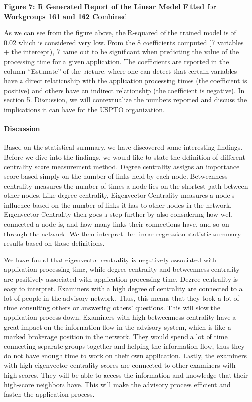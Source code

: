 \documentclass[
]{article}
\begin{document}
\textbf{Figure 7: R Generated Report of the Linear Model Fitted for
Workgroups 161 and 162 Combined}

As we can see from the figure above, the R-squared of the trained model
is of 0.02 which is considered very low. From the 8 coefficients
computed (7 variables + the intercept), 7 came out to be significant
when predicting the value of the processing time for a given
application. The coefficients are reported in the column ``Estimate'' of
the picture, where one can detect that certain variables have a direct
relationship with the application processing times (the coefficient is
positive) and others have an indirect relationship (the coefficient is
negative). In section 5. Discussion, we will contextualize the numbers
reported and discuss the implications it can have for the USPTO
organization.

\hypertarget{discussion}{%
\paragraph{Discussion}\label{discussion}}

Based on the statistical summary, we have discovered some interesting
findings. Before we dive into the findings, we would like to state the
definition of different centrality score measurement method. Degree
centrality assigns an importance score based simply on the number of
links held by each node. Betweenness centrality measures the number of
times a node lies on the shortest path between other nodes. Like degree
centrality, Eigenvector Centrality measures a node's influence based on
the number of links it has to other nodes in the network. Eigenvector
Centrality then goes a step further by also considering how well
connected a node is, and how many links their connections have, and so
on through the network. We then interpret the linear regression
statistic summary results based on these definitions.

We have found that eigenvector centrality is negatively associated with
application processing time, while degree centrality and betweenness
centrality are positively associated with application processing time.
Degree centrality is easy to interpret. Examiners with a high degree of
centrality are connected to a lot of people in the advisory network.
Thus, this means that they took a lot of time consulting others or
answering others' questions. This will slow the application process
down. Examiners with high betweenness centrality have a great impact on
the information flow in the advisory system, which is like a marked
brokerage position in the network. They would spend a lot of time
connecting separate groups together and helping the information flow,
thus they do not have enough time to work on their own application.
Lastly, the examiners with high eigenvector centrality scores are
connected to other examiners with high scores. They will be able to
access the information and knowledge that their high-score neighbors
have. This will make the advisory process efficient and fasten the
application process.
\end{document}
